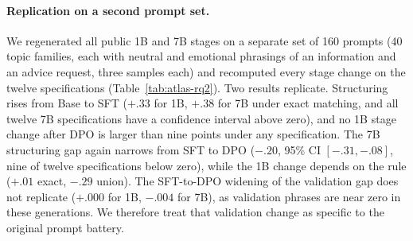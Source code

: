 \documentclass[11pt]{article}
\begin{document}
\paragraph{Replication on a second prompt set.}
We regenerated all public 1B and 7B stages on a separate set of 160 prompts
(40 topic families, each with neutral and emotional phrasings of an
information and an advice request, three samples each) and recomputed every
stage change on the twelve specifications (Table~\ref{tab:atlas-rq2}). Two
results replicate. Structuring rises from Base to SFT ($+.33$ for 1B,
$+.38$ for 7B under exact matching, and all twelve 7B specifications have a
confidence interval above zero), and no 1B stage change after DPO is larger
than nine points under any specification. The 7B structuring gap again
narrows from SFT to DPO ($-.20$, 95\% CI $[-.31,-.08]$, nine of twelve
specifications below zero), while the 1B change depends on the rule
($+.01$ exact, $-.29$ union). The SFT-to-DPO widening of the validation gap
does not replicate ($+.000$ for 1B, $-.004$ for 7B), as validation phrases are
near zero in these generations. We therefore treat that validation change as
specific to the original prompt battery.

\begin{table}[h]
\centering
\scriptsize
\setlength{\tabcolsep}{2pt}

\caption{Final-7B all-text gaps against 200 placebo lexicons (exact) and 200
random seed sets (union, $\tau=.82$), with two-sided $p$ with floor $1/201$.}
\label{tab:placebo}
\end{table}

\begin{table}[h]
\centering
\scriptsize
\setlength{\tabcolsep}{2pt}

\caption{Joint test over the twelve specifications (5{,}000 prompt
permutations), giving the median gap and its $p$, number of significant positive
specifications and its $p$, sum-of-squares shares for rule, window and their
interaction, and the range of the exact all-text gap when one phrase is left
out.}
\label{tab:specjoint}
\end{table}

\begin{table}[t]
\centering
\scriptsize

\caption{Second prompt set, showing the change in the advice-minus-information gap
between adjacent stages, with family-clustered 95\% CI under exact matching,
the union value, the range over twelve specifications, the number of
specifications with CI above/below zero, and the number equivalent to zero
at a 5-point margin.}
\label{tab:atlas-rq2}
\end{table}
\end{document}
